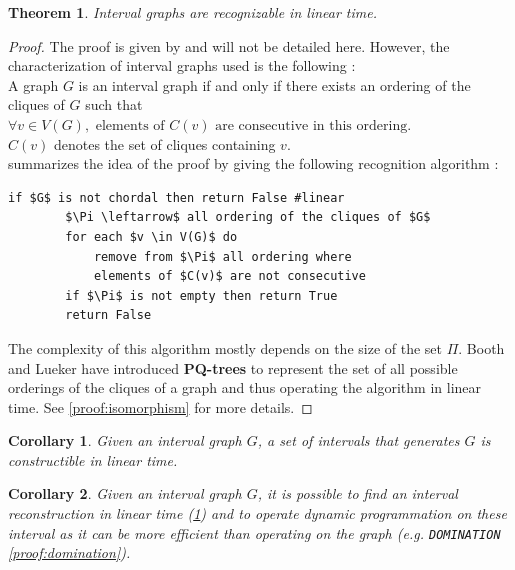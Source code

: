 \documentclass{article}
\newtheorem{theorem}{Theorem}[section]
\newtheorem{corollary}{Corollary}
\begin{document}
\begin{theorem}
    \label{theorem:interval_recognition}
    Interval graphs are recognizable in linear time.
\end{theorem}

\begin{proof}
The proof is given by \cite{booth} and will not be detailed here.
However, the characterization of interval graphs used is the following : \\
A graph $G$ is an interval graph if and only if there exists 
an ordering of the cliques of $G$ such that 
$\forall v\in V(G), \text{ elements of } C(v) \text{ are consecutive in this ordering}$. \\
$C(v)$ denotes the set of cliques containing $v$. \\

\cite{isomorphism} summarizes the idea of the proof by giving the following recognition algorithm : \\

    \begin{lstlisting}[mathescape=true, caption={Interval graph recognition algorithm}, label={lst:interval_recognition}, frame=single]
        if $G$ is not chordal then return False #linear
        $\Pi \leftarrow$ all ordering of the cliques of $G$
        for each $v \in V(G)$ do
            remove from $\Pi$ all ordering where 
            elements of $C(v)$ are not consecutive
        if $\Pi$ is not empty then return True
        return False
    \end{lstlisting}

    The complexity of this algorithm mostly depends on the size of the set $\Pi$.
    Booth and Lueker have introduced \textbf{PQ-trees} to represent the set of all possible 
    orderings of the cliques of a graph and thus operating the algorithm in linear time.
    See \cref{proof:isomorphism} for more details.

\end{proof}

\begin{corollary}
    \label{corollary:interval_reconstruction}
    Given an interval graph $G$, a set of intervals that generates $G$ is constructible in linear time.
\end{corollary}

\begin{corollary}
    \label{corollary:interval_optimization}
    Given an interval graph $G$, it is possible to find an interval reconstruction in linear time (\cref{corollary:interval_reconstruction}) 
    and to operate dynamic programmation on these interval as it can be more efficient than operating on the graph (\emph{e.g.} \texttt{DOMINATION} \cref{proof:domination}).
\end{corollary}
\end{document}
